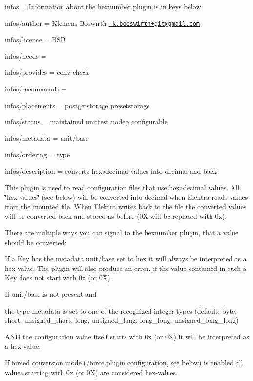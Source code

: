 
\begin{DoxyItemize}
\item infos = Information about the hexnumber plugin is in keys below
\item infos/author = Klemens Böswirth \href{mailto:k.boeswirth+git@gmail.com}{\texttt{ k.\+boeswirth+git@gmail.\+com}}
\item infos/licence = B\+SD
\item infos/needs =
\item infos/provides = conv check
\item infos/recommends =
\item infos/placements = postgetstorage presetstorage
\item infos/status = maintained unittest nodep configurable
\item infos/metadata = unit/base
\item infos/ordering = type
\item infos/description = converts hexadecimal values into decimal and back
\end{DoxyItemize}

This plugin is used to read configuration files that use hexadecimal values. All \char`\"{}hex-\/values\char`\"{} (see below) will be converted into decimal when Elektra reads values from the mounted file. When Elektra writes back to the file the converted values will be converted back and stored as before ({\ttfamily 0X} will be replaced with {\ttfamily 0x}).

There are multiple ways you can signal to the hexnumber plugin, that a value should be converted\+:


\begin{DoxyEnumerate}
\item If a Key has the metadata {\ttfamily unit/base} set to {\ttfamily hex} it will always be interpreted as a hex-\/value. The plugin will also produce an error, if the value contained in such a Key does not start with {\ttfamily 0x} (or {\ttfamily 0X}).
\item If {\ttfamily unit/base} is not present and
\begin{DoxyItemize}
\item the {\ttfamily type} metadata is set to one of the recognized integer-\/types (default\+: {\ttfamily byte}, {\ttfamily short}, {\ttfamily unsigned\+\_\+short}, {\ttfamily long}, {\ttfamily unsigned\+\_\+long}, {\ttfamily long\+\_\+long}, {\ttfamily unsigned\+\_\+long\+\_\+long})
\item A\+ND the configuration value itself starts with {\ttfamily 0x} (or {\ttfamily 0X}) it will be interpreted as a hex-\/value.
\end{DoxyItemize}
\item If forced conversion mode ({\ttfamily /force} plugin configuration, see below) is enabled all values starting with {\ttfamily 0x} (or {\ttfamily 0X}) are considered hex-\/values.
\end{DoxyEnumerate}

